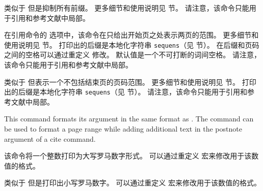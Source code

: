 \begin{ltxsyntax}
类似于  但是抑制所有前缀。
更多细节和使用说明见  节。
请注意，该命令只能用于引用和参考文献中局部。



在引用命令的  选项中，该命令在只给出开始页之处表示两页的范围。
更多细节和使用说明见  节。
打印出的后缀是本地化字符串 \texttt{sequens}（见  节）。
在后缀和页码之间的空格可以通过重定义  修改。
默认值是一个不可打断的词间空格。
请注意，该命令只能用于引用和参考文献中局部。



类似于  但表示一个不包括结束页的页码范围。
更多细节和使用说明见  节。
打印出的后缀是本地化字符串 \texttt{sequens}（见  节）。
请注意，该命令只能用于引用和参考文献中局部。

This command formats its argument  in the same format as . The command can be used to format a page range while adding additional text in the postnote argument of a cite command.

\begin{ltxexample}
\autocite[ and more]{sigfridsson}
\end{ltxexample}



该命令将一个整数打印为大写罗马数字形式。
可以通过重定义  宏来修改用于该数值的格式。



类似于  但是打印出小写罗马数字。
可以通过重定义  宏来修改用于该数值的格式。

\end{ltxsyntax}

